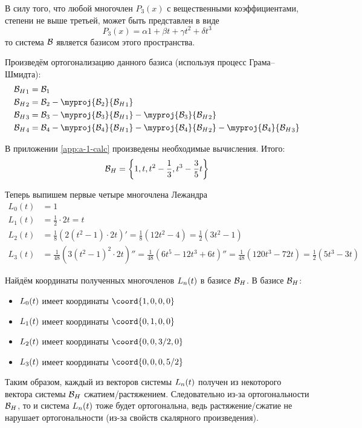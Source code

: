 В силу того, что любой многочлен \(P_{3}(x)\) с вещественными коэффициентами,
степени не выше третьей, может быть представлен в виде
\[P_{3}(x) = α 1 + β t + γ t^2 + δ t^3\]
то система \(\Bs\) является базисом этого пространства.

Произведём ортогонализацию данного базиса (используя процесс Грама--Шмидта):
\begin{align*}
  \BsH_1 &= \Bs_1 \\
  \BsH_2 &= \Bs_2 - \myproj{\Bs_2}{\BsH_1} \\
  \BsH_3 &= \Bs_3 - \myproj{\Bs_3}{\BsH_1} - \myproj{\Bs_3}{\BsH_2} \\
  \BsH_4 &= \Bs_4 - \myproj{\Bs_4}{\BsH_1} - \myproj{\Bs_4}{\BsH_2}
    - \myproj{\Bs_4}{\BsH_3}
\end{align*}

В приложении \ref{app:a-1-calc} произведены необходимые вычисления.
Итого:
\[\BsH = \left\{ 1, t, t^2 - \frac{1}{3}, t^3 - \frac{3}{5}t \right\}\]

Теперь выпишем первые четыре многочлена Лежандра
\begin{align*}
  L_0(t) &= 1 \\
  L_1(t) &= \frac{1}{2} \cdot 2t = t \\
  L_2(t) &= \frac{1}{8} {\left( 2(t^2 - 1) \cdot 2t \right)}'
    = \frac{1}{8} (12t^2 - 4) = \frac{1}{2} (3t^2 - 1) \\
  L_3(t) &= \frac{1}{48} {\left( 3(t^2 - 1)^2 \cdot 2t \right)}''
    = \frac{1}{48} {(6 t^5 - 12 t^3 + 6t)}''
    = \frac{1}{48} (120 t^3 - 72 t)
    = \frac{1}{2} (5 t^3 - 3 t)
\end{align*}

Найдём координаты полученных многочленов \(\Leg\) в базисе \(\BsH\).
В базисе \(\BsH\):
\begin{itemize}
  \item \(\Leg[0]\) имеет координаты \(\coord{1, 0, 0, 0}\)
  \item \(\Leg[1]\) имеет координаты \(\coord{0, 1, 0, 0}\)
  \item \(\Leg[2]\) имеет координаты \(\coord{0, 0, 3/2, 0}\)
  \item \(\Leg[3]\) имеет координаты \(\coord{0, 0, 0, 5/2}\)
\end{itemize}

Таким образом, каждый из векторов системы \(\Leg\)
получен из некоторого вектора системы \(\BsH\) сжатием/растяжением.
Следовательно из-за ортогональности \(\BsH\), то и система \(\Leg\)
тоже будет ортогональна, ведь растяжение/сжатие не нарушает ортогональности
(из-за свойств скалярного произведения).

